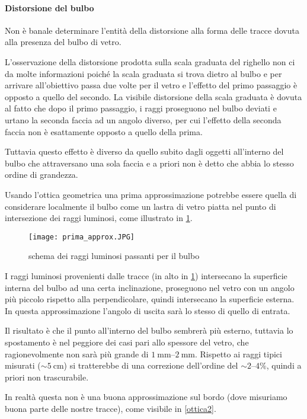 \paragraph{Distorsione del bulbo} Non è banale determinare l'entità della distorsione alla forma delle tracce dovuta alla presenza del bulbo di vetro.

L'osservazione della distorsione prodotta sulla scala graduata del righello non ci da molte informazioni poiché la scala graduata si trova dietro al bulbo e per arrivare all'obiettivo passa due volte per il vetro e l'effetto del primo passaggio è opposto a quello del secondo. La visibile distorsione della scala graduata è dovuta al fatto che dopo il primo passaggio, i raggi proseguono  nel bulbo deviati e urtano la seconda faccia ad un angolo diverso, per cui l'effetto della seconda faccia non è esattamente opposto a quello della prima.

Tuttavia questo effetto è diverso da quello subito dagli oggetti all'interno del bulbo che attraversano una sola faccia e a priori non è detto che abbia lo stesso ordine di grandezza.

Usando l'ottica geometrica una prima approssimazione potrebbe essere quella di considerare localmente il bulbo come un lastra di vetro piatta nel punto di intersezione dei raggi luminosi, come illustrato in \figurename{ \ref{ottica1}}.

\begin{figure}[H]
	\centering
	\texttt{[image: prima\_approx.JPG]}
	\caption{schema dei raggi luminosi passanti per il bulbo}
	\label{ottica1}
\end{figure}

I raggi luminosi provenienti dalle tracce (in alto in \figurename{ \ref{ottica1}}) intersecano la superficie interna del bulbo ad una certa inclinazione, proseguono nel vetro con un angolo più piccolo rispetto alla perpendicolare, quindi intersecano la superficie esterna. In questa approssimazione l'angolo di uscita sarà lo stesso di quello di entrata.

Il risultato è che il punto all'interno del bulbo sembrerà più esterno, tuttavia lo spostamento è nel peggiore dei casi pari allo spessore del vetro, che ragionevolmente non sarà più grande di $\SIrange{1}{2}{\mm}$. Rispetto ai raggi tipici misurati ($\sim \SI{5}{\cm}$) si tratterebbe di una correzione dell'ordine del $\sim \SIrange{2}{4}\%$, quindi a priori non trascurabile.

In realtà questa non è una buona approssimazione sul bordo (dove misuriamo buona parte delle nostre tracce), come visibile in \figurename{ \ref{ottica2}}.

